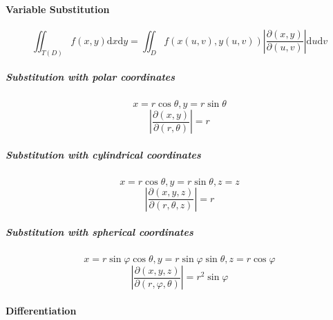 \paragraph{Variable Substitution}

$$\iint_{T(D)}f(x,y)\mathrm{d}x\mathrm{d}y=\iint_{D}f(x(u,v),y(u,v))\left|\frac{\partial(x,y)}{\partial(u,v)}\right|\mathrm{d}u\mathrm{d}v$$

\subparagraph{Substitution with polar coordinates}

$$x=r\cos\theta,y=r\sin\theta$$
$$\left|\frac{\partial(x,y)}{\partial(r,\theta)}\right|=r$$

\subparagraph{Substitution with cylindrical coordinates}

$$x=r\cos\theta,y=r\sin\theta,z=z$$
$$\left|\frac{\partial(x,y,z)}{\partial(r,\theta,z)}\right|=r$$

\subparagraph{Substitution with spherical coordinates}

$$x=r\sin\varphi\cos\theta,y=r\sin\varphi\sin\theta,z=r\cos\varphi$$
$$\left|\frac{\partial(x,y,z)}{\partial(r,\varphi,\theta)}\right|=r^2\sin\varphi$$

\paragraph{Differentiation}
\def\sinh{\mathop{\rm sinh}\nolimits}
\def\cosh{\mathop{\rm cosh}\nolimits}
\def\sech{\mathop{\rm sech}\nolimits}
\def\csch{\mathop{\rm csch}\nolimits}
\def\coth{\mathop{\rm coth}\nolimits}
\def\tanh{\mathop{\rm tanh}\nolimits}

